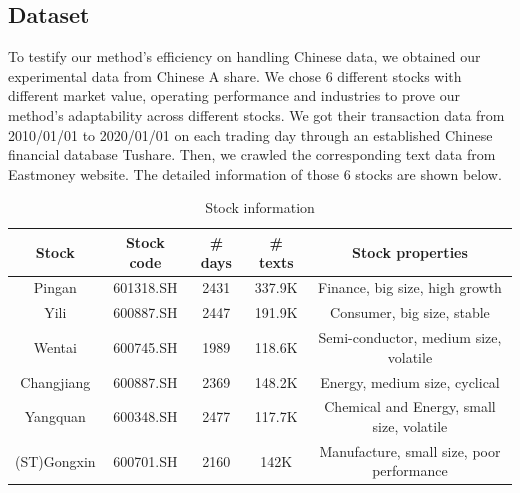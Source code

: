 \documentclass[runningheads]{llncs}
\begin{document}
\subsection{Dataset}
To testify our method’s efficiency on handling Chinese data, we obtained our experimental data from Chinese A share. We chose 6 different stocks with different market value, operating performance and industries to prove our method’s adaptability across different stocks. We got their transaction data from 2010/01/01 to 2020/01/01 on each trading day through an established Chinese financial database Tushare. Then, we crawled the corresponding text data from Eastmoney website. The detailed information of those 6 stocks are shown below.
\begin{table}[htbp]
	\renewcommand\arraystretch{1}
	\caption{Stock information}\label{tab:data}
	\begin{tabular}{c|c|c|c|c}
		\hline
		Stock&Stock code&\# days &\# texts&Stock properties\\\hline\hline
		Pingan&601318.SH&2431&337.9K&Finance, big size, high growth\\\hline
		Yili&600887.SH&2447&191.9K&Consumer, big size, stable\\\hline
		Wentai&600745.SH&1989&118.6K&Semi-conductor, medium size, volatile\\\hline
		Changjiang&600887.SH&2369&148.2K&Energy, medium size, cyclical\\\hline
		Yangquan&600348.SH&2477&117.7K&Chemical and Energy, small size, volatile\\\hline
		(ST)Gongxin&600701.SH&2160&142K&Manufacture, small size, poor performance\\\hline
	\end{tabular}
\end{table}
\end{document}
